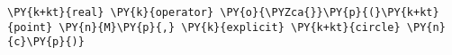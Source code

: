 \begin{Verbatim}[commandchars=\\\{\}]
    \PY{k+kt}{real} \PY{k}{operator} \PY{o}{\PYZca{}}\PY{p}{(}\PY{k+kt}{point} \PY{n}{M}\PY{p}{,} \PY{k}{explicit} \PY{k+kt}{circle} \PY{n}{c}\PY{p}{)}
\end{Verbatim}
